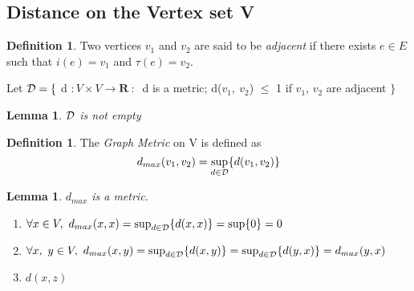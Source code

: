 \documentclass[a4paper,10pt]{book}
\newtheorem{lemma}[theorem]{Lemma}
\theoremstyle{definition}
\newtheorem{definition}[theorem]{Definition}
\theoremstyle{remark}
\numberwithin{section}{chapter}
\numberwithin{equation}{chapter}
\begin{document}
   \subsection{Distance on the Vertex set V}
   \begin{definition}
      Two vertices $ v_{1}$ and $v_{2} $ are said to be \emph{adjacent} if there exists $ e \in E $ such that $ i(e) = v_1 $ and $ \tau (e) = v_2 $.
   \end{definition}
   Let $ \cal{D} = \{ $ d $: V \times V \rightarrow \mathbf{R} \ : \ $ 
 d is a metric; d($ v_1,\ v_2 $) $ \leq $ 1 if $ v_1 $, $ v_2 $ are adjacent $ \} $
   \begin{lemma}
      $ \cal{D} $ is not empty
   \end{lemma}
   \begin{definition}
      The \emph{Graph Metric} on V is defined as
      \begin{equation}
	  d_{max}(v_1,v_2)= \sup_{d \in \cal{D} }\{d(v_1,v_2) \} \nonumber
      \end{equation} 
   \end{definition}
   \begin{lemma}
	$ d_{max} $ is a metric.
    \proof 
    \begin{enumerate}
      \item $\forall x \in V,\ d_{max}(x, x)= \sup_{d \in \cal{D}}\{d(x,x) \} = \sup \{ 0 \} = 0 $
      \item $\forall x,\ y \in V,\ d_{max}(x, y)= \sup_{d \in \cal{D} }\{d(x,y) \} = \sup_{d \in \cal{D} }\{d(y,x) \} =d _{max}(y, x) $
      \item $d(x, z)$
    \end{enumerate}    
  \end{lemma}
\end{document}
